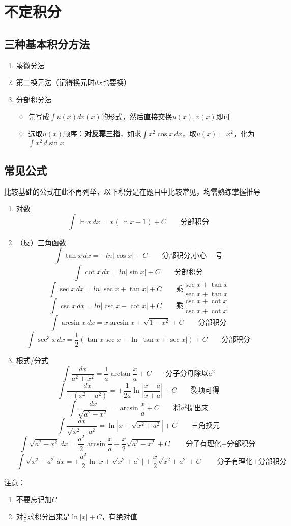 
\section{不定积分}
\label{section_integration}
\subsection{三种基本积分方法}
\begin{enumerate}
	\item 凑微分法
	\item 第二换元法（记得换元时$dx$也要换）
	\item 分部积分法
	\begin{itemize}
		\item 先写成$\displaystyle\int u(x)dv(x)$的形式，然后直接交换$u(x),v(x)$即可
		\item 选取$u(x)$顺序：\textbf{对反幂三指}，如求$\displaystyle\int x^2\cos x\,dx$，取$u(x)=x^2$，化为$\displaystyle\int x^2\,d\sin x$
	\end{itemize}
\end{enumerate}

\subsection{常见公式}
比较基础的公式在此不再列举，以下积分是在题目中比较常见，均需熟练掌握推导
\begin{enumerate}
\item 对数
\[\int \ln x\,dx=x(\ln x-1)+C\qquad\mbox{分部积分}\]
\item （反）三角函数
\[\int \tan x\,dx=-ln|\cos x|+C\qquad\mbox{分部积分,小心}-\mbox{号}\]
\[\int \cot x\,dx=ln|\sin x|+C\qquad\mbox{分部积分}\]
\[\int \sec x\,dx=ln|\sec x+\tan x|+C\qquad\mbox{乘}\frac{\sec x+\tan x}{\sec x+\tan x}\]
\[\int \csc x\,dx=ln|\csc x-\cot x|+C\qquad\mbox{乘}\frac{\csc x+\cot x}{\csc x+\cot x}\]
\[\int \arcsin x\,dx=x\arcsin x+\sqrt{1-x^2}+C\qquad\mbox{分部积分}\]
\[\int \sec^3 x \, dx=\frac{1}{2} (\tan x \sec x+\ln |\tan x+\sec x|)+C\qquad\mbox{分部积分}\]
\item 根式/分式
\[\int \frac{dx}{a^2+x^2}=\frac{1}{a} \arctan\frac{x}{a}+C\qquad\mbox{分子分母除以}a^2\]
\[\int \frac{dx}{\pm(x^2-a^2)}=\pm\frac{1}{2a} \ln|\frac{x-a}{x+a}|+C\qquad\mbox{裂项可得}\]
\[\int \frac{dx}{\sqrt{a^2-x^2}}=\arcsin\frac{x}{a}+C\qquad\mbox{将}a^2\mbox{提出来}\]
\[\int \frac{dx}{\sqrt{x^2\pm a^2}}=\ln|x+\sqrt{x^2\pm a^2}|+C\qquad\mbox{三角换元}\]
\[\int \sqrt{a^2-x^2}\,dx=\frac{a^2}{2}\arcsin\frac{x}{a}+\frac{x}{2}\sqrt{a^2-x^2}+C\qquad\mbox{分子有理化$+$分部积分}\]
\[\int \sqrt{x^2\pm a^2}\,dx=\pm\frac{a^2}{2} \ln\Big|x+\sqrt{x^2\pm a^2}\Big|+\frac{x}{2}\sqrt{x^2\pm a^2}+C\qquad\mbox{分子有理化$+$分部积分}\]
\end{enumerate}
注意：
\begin{enumerate}
\item 不要忘记加$C$
\item 对$\displaystyle \frac{1}{x}$求积分出来是$\ln |x|+C$，有绝对值
\end{enumerate}

